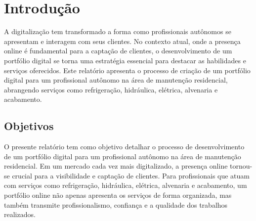 \chapter{Introdução}
\label{chap:intro}

A digitalização tem transformado a forma como profissionais autônomos se apresentam e interagem com seus clientes. No contexto atual, onde a presença online é fundamental para a captação de clientes, o desenvolvimento de um portfólio digital se torna uma estratégia essencial para destacar as habilidades e serviços oferecidos. Este relatório apresenta o processo de criação de um portfólio digital para um profissional autônomo na área de manutenção residencial, abrangendo serviços como refrigeração, hidráulica, elétrica, alvenaria e acabamento.






% 
\section{Objetivos}
\label{sec:obj}

O presente relatório tem como objetivo detalhar o processo de desenvolvimento de um portfólio digital para um profissional autônomo na área de manutenção residencial. Em um mercado cada vez mais digitalizado, a presença online tornou-se crucial para a visibilidade e captação de clientes. Para profissionais que atuam com serviços como refrigeração, hidráulica, elétrica, alvenaria e acabamento, um portfólio online não apenas apresenta os serviços de forma organizada, mas também transmite profissionalismo, confiança e a qualidade dos trabalhos realizados.

